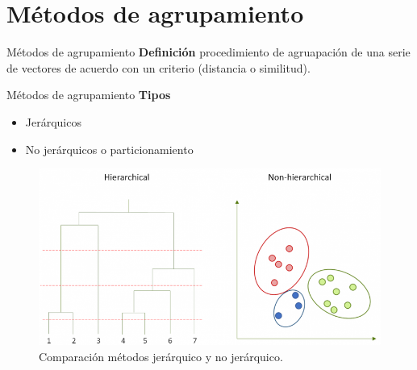 \documentclass[spanish]{beamer}
\begin{document}
\section{Métodos de agrupamiento}
\begin{frame}{Métodos de agrupamiento}
	\centering
	\textbf{Definición} procedimiento de agruapación de una serie de vectores de acuerdo con un criterio (distancia o similitud).\\
\end{frame}

\begin{frame}{Métodos de agrupamiento}
	\textbf{Tipos}
	\begin{itemize}
		\item Jerárquicos
		\item No jerárquicos o particionamiento
	\end{itemize}
	\begin{figure}[H]
		\centering
		\includegraphics[scale=0.3]{victoria/compJerarquicoNoJerarquico}
		\caption{Comparación métodos jerárquico y no jerárquico.}
		\label{fig:ejemplo_metodos}
	\end{figure}

\end{frame}
\end{document}
